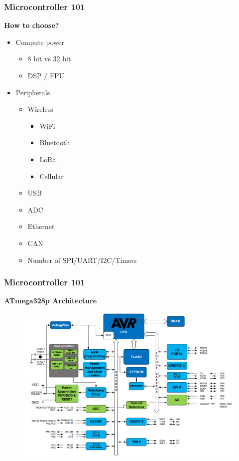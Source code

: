 \documentclass[t]{beamer}
\begin{document}
\begin{frame}[t]
\frametitle{Microcontroller 101}

\textbf{How to choose?}
\begin{itemize}
	\item Compute power
	\begin{itemize}
		\item 8 bit vs 32 bit
		\item DSP / FPU
	\end{itemize} 
	\item Peripherals 
	\begin{itemize}
		\item Wireless
			\begin{itemize}
			\item WiFi
			\item Bluetooth
			\item LoRa
			\item Cellular
		\end{itemize} 
		\item USB
		\item ADC
		\item Ethernet
		\item CAN
		\item Number of SPI/UART/I2C/Timers
	\end{itemize} 
	
\end{itemize} 



\end{frame}


\begin{frame}[t]
\frametitle{Microcontroller 101}
\textbf{ATmega328p Architecture} 
\begin{figure}
	\includegraphics[scale=0.4]{328pArchitecture.PNG}
\end{figure}

\end{frame}
\end{document}
